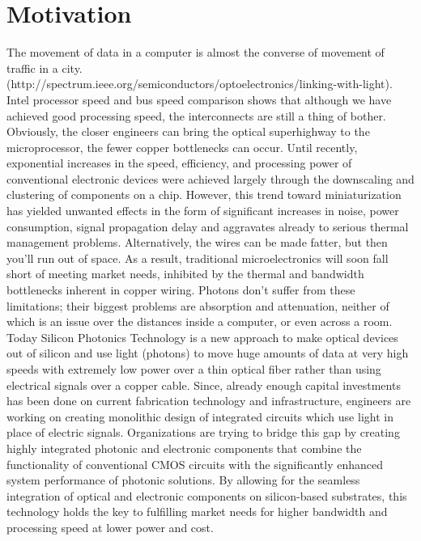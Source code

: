 \documentclass[../main.tex]{subfiles}
\begin{document}
	\section{Motivation}
The movement of data in a computer is almost the converse of movement of traffic in a city.	(http://spectrum.ieee.org/semiconductors/optoelectronics/linking-with-light). Intel processor speed and bus speed comparison shows that although we have achieved good processing speed, the interconnects are still a thing of bother. Obviously, the closer engineers can bring the optical superhighway to the microprocessor, the fewer copper bottlenecks can occur. Until recently, exponential increases in the speed, efficiency, and processing power of conventional electronic devices were achieved largely through the downscaling and clustering of components on a chip. However, this trend toward miniaturization has yielded unwanted effects in the form of significant increases in noise, power consumption, signal propagation delay and aggravates already to serious thermal management problems. Alternatively, the wires can be made fatter, but then you'll run out of space.  As a result, traditional microelectronics will soon fall short of meeting market needs, inhibited by the thermal and bandwidth bottlenecks inherent in copper wiring. Photons don't suffer from these limitations; their biggest problems are absorption and attenuation, neither of which is an issue over the distances inside a computer, or even across a room. Today Silicon Photonics Technology is a new approach to make optical devices out of silicon and use light (photons) to move huge amounts of data at very high speeds with extremely low power over a thin optical fiber rather than using electrical signals over a copper cable. Since, already enough capital investments has been done on current fabrication technology and infrastructure, engineers are working on creating monolithic design of integrated circuits which use light in place of electric signals. Organizations are trying to bridge this gap by creating highly integrated photonic and electronic components that combine the functionality of conventional CMOS circuits with the significantly enhanced system performance of photonic solutions. By allowing for the seamless integration of optical and electronic components on silicon-based substrates, this technology holds the key to fulfilling market needs for higher bandwidth and processing speed at lower power and cost.
\end{document}
